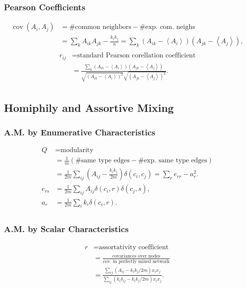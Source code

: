 \documentclass[a4paper,twocolumn,10pt]{article}
\newcommand{\ang}[1]{\left\langle {#1} \right\rangle}
\newcommand{\pte}[1]{\left({#1}\right)}
\newcommand{\op}{\operatorname}
\begin{document}
	\subsubsection{Pearson Coefficients}
		\[ \begin{split}
			\op{cov}(A_i,A_j)
			&= \#\textrm{common neighbors} - \#\textrm{exp. com. neighs} \\
			&= \sum_k A_{ik} A_{jk} - \frac{k_i k_j}{n} 
			= \sum_k \pte{A_{ik}-\ang{A_i}} \pte{A_{jk}-\ang{A_j}}, \\
		\end{split} \]
		\[ \begin{split}
			r_{ij}
			&= \textrm{standard Pearson corellation coefficient} \\
			&= \frac{\sum_k \pte{A_{ik}-\ang{A_i}} \pte{A_{jk}-\ang{A_j}}}
				{\sqrt{\pte{A_{ik}-\ang{A_i}}^2} \sqrt{\pte{A_{jk}-\ang{A_j}}^2}}. \\
		\end{split} \]

\subsection{Homiphily and Assortive Mixing}
	\subsubsection{A.M. by Enumerative Characteristics}
		\[ \begin{split}
			Q &= \textrm{modularity} \\
			&= \frac{1}{m} \pte{\#\textrm{same type edges} - \#\textrm{exp. same type edges}} \\
			&= \frac{1}{2m} \sum_{ij} \pte{A_{ij} - \frac{k_i k_j}{2m}} \delta(c_i,c_j)
			=\sum_r e_{rr} - a_r^2. \\
			e_{rs} &= \frac{1}{2m} \sum_{ij} A_{ij} \delta(c_i,r) \delta(c_j,s), \\
			a_r &= \frac{1}{2m} \sum_i k_i \delta(c_i,r). \\
		\end{split} \]
	
	\subsubsection{A.M. by Scalar Characteristics}
		\[ \begin{split}
			r &= \textrm{assortativity coefficient} \\
			&= \frac{\textrm{covariances over nodes}}{\textrm{cov. in perfectly mixed network}} \\
			&= \frac{\sum_{ij} \pte{A_{ij} - k_i k_j / 2m} x_i x_j}
				{\sum_{ij} \pte{k_i \delta_{ij} - k_i k_j /2m} x_i x_j}.
		\end{split} \]
\end{document}
